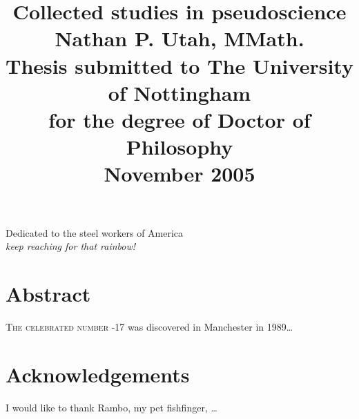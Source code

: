 \documentclass[11pt,a4paper]{report}
\numberwithin{equation}{section}
\begin{document}
	
	\title{
		\huge{\textbf{Collected studies in pseudoscience}} \\[1.2cm]
		\Large{	Nathan P. Utah, MMath.} \\[1.2cm]
		\Large{Thesis submitted to The University of Nottingham \\ 
		for the degree of Doctor of Philosophy} \\ \vspace{1cm}
		\Large{November 2005} 
	} 
	\author{} \date{}
	\maketitle
	
 	\newpage \vspace*{8cm} 
	\begin{center} 
		\large Dedicated to the steel workers of America \\
		\emph{keep reaching for that rainbow!}
 	\end{center}

	\newpage 
	\chapter*{Abstract}
	\textsc{The celebrated number} -17 was discovered in Manchester
	in 1989\dots 

 	\chapter*{Acknowledgements}
	I would like to thank Rambo, my pet fishfinger, \dots
	
	\tableofcontents 
	\newpage	
 	
	
	
	
\end{document}
